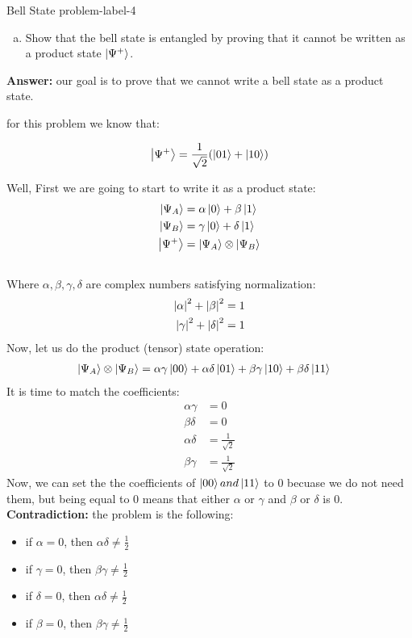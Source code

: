 \begin{problem}{Bell State }{problem-label-4}
	
	\begin{enumerate}[(a)]
		\item Show that the bell state is entangled by proving that it cannot be written as a product state $\ket{\Psi^+}$.
	\end{enumerate}
	\textbf{Answer:}
	our goal is to prove that we cannot  write a bell state as a product state. 
	
	for this problem we know that:
	
	\[
	\ket{\Psi^+} = \frac{1}{\sqrt{2}} (\ket{01}+\ket{10})
	\]
	
	Well, First we are going to start to write it as a product state:\\
	\[
	\begin{aligned}
		\ket{\Psi_A} &= \alpha\ket{0} + \beta\ket{1} \\
		\ket{\Psi_B} &= \gamma\ket{0} + \delta\ket{1} \\
		\ket{\Psi^+} &= \ket{\Psi_A} \otimes \ket{\Psi_B}\\\\
	\end{aligned}
	\]
	Where $\alpha,\beta,\gamma,\delta$ are complex numbers satisfying normalization:
	\[
	\begin{aligned}
		\abs{\alpha}^2 + \abs{\beta}^2 &= 1\\
		\abs{\gamma}^2 + \abs{\delta}^2 &= 1
	\end{aligned}
	\]
	Now, let us do the product (tensor) state operation:
	\[
	\begin{aligned}
		\ket{\Psi_A} \otimes \ket{\Psi_B} &=   \alpha\gamma\ket{00} + \alpha\delta\ket{01} + \beta\gamma\ket{10} +  \beta\delta\ket{11}
	\end{aligned}
	\]
	It is time to match the coefficients:
	\[
	\begin{aligned}
		\alpha\gamma &= 0\\
		\beta\delta &= 0 \\
		\alpha\delta &= \frac{1}{\sqrt{2}}\\
		\beta\gamma &= \frac{1}{\sqrt{2}}
	\end{aligned}
	\]
	Now, we can set the the coefficients of $\ket{00} and \ket{11}$ to 0 becuase we do not need them, but being equal to 0 means that either $ \alpha$ or $\gamma$ and $\beta$ or $\delta$ is 0. \\
	
	\textbf{Contradiction:} the problem is the following:
	\begin{itemize}
		\item if $\alpha = 0$, then $\alpha\delta \not= \frac{1}{2}$
		\item if $\gamma = 0$, then $\beta\gamma \not= \frac{1}{2}$
		\item if $\delta = 0$, then $\alpha\delta \not= \frac{1}{2}$
		\item if $\beta = 0$, then $\beta\gamma \not= \frac{1}{2}$
	\end{itemize}
	

\end{problem}
